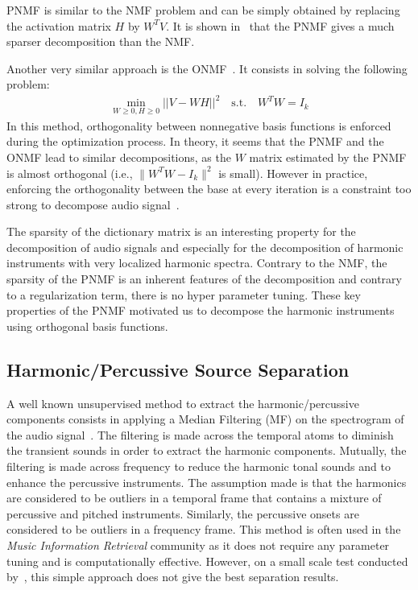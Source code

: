 PNMF is similar to the NMF problem and can be simply obtained by replacing the activation matrix $H$ by $W^TV$. It is shown in~\cite{YangOja10} that the PNMF gives a much sparser decomposition than the NMF.

Another very similar approach is the ONMF~\cite{choi}. It consists in solving the following problem: 
\begin{align}
\min_{W \geqslant 0, H \geqslant0} ||V - WH||^2 \quad   \text{s.t}.\quad W^{T}W=I_{k} 
\end{align}%
In this method, orthogonality between nonnegative basis functions is enforced during the optimization process. In theory, it seems that the PNMF and the ONMF lead to similar decompositions, as the $W$ matrix estimated by the PNMF is almost orthogonal (i.e., $\|W^{T}W-I_{k}\|^{2}$ is small). However in practice, enforcing the orthogonality between the base at every iteration is a constraint too strong to decompose audio signal~\cite{laroche2015structured}. 

The sparsity of the dictionary matrix is an interesting property for the decomposition of audio signals and especially for the decomposition of harmonic instruments with very localized harmonic spectra. Contrary to the NMF, the sparsity of the PNMF is an inherent features of the decomposition and contrary to a regularization term, there is no hyper parameter tuning. These key properties of the PNMF motivated us to decompose the harmonic instruments using orthogonal basis functions.




\subsection{Harmonic/Percussive Source Separation}


A well known unsupervised method to extract the harmonic/percussive components consists in applying a Median Filtering (MF) on the spectrogram of the audio signal~\cite{fitzgerald2010harmonic}. The filtering is made across the temporal atoms to diminish the transient sounds in order to extract the harmonic components. Mutually, the filtering is made across frequency to reduce the harmonic tonal sounds and to enhance the percussive instruments. The assumption made is that the harmonics are considered to be outliers in a temporal frame that contains a mixture of percussive and pitched instruments. Similarly, the percussive onsets are considered to be outliers in a frequency frame. This method is often used in the \emph{Music Information Retrieval} community as it does not require any parameter tuning and is computationally effective. However, on a small scale test conducted by~\cite{canadas2014percussive}, this simple approach does not give the best separation results.



